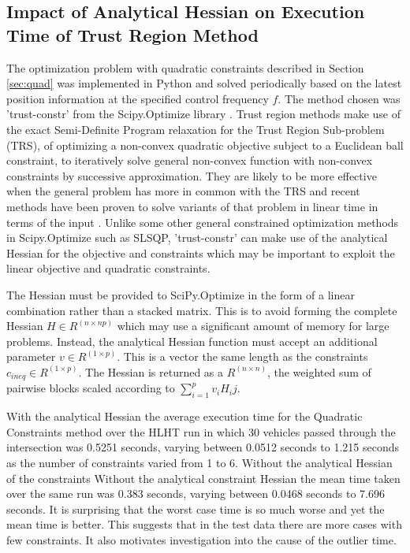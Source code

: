 \subsection{Impact of Analytical Hessian on Execution Time of Trust Region Method}
The optimization problem with quadratic constraints described in Section \ref{sec:quad} was implemented in Python and solved periodically based on the latest position information at the specified control frequency $f$. The method chosen was 'trust-constr' from the Scipy.Optimize library \cite{scipy}. Trust region methods make use of the exact Semi-Definite Program relaxation for the Trust Region Sub-problem (TRS), of optimizing a non-convex quadratic objective subject to a Euclidean ball constraint, to iteratively solve general non-convex function with non-convex constraints by successive approximation\cite{conn2000trust}. They are likely to be more effective when the general problem has more in common with the TRS and recent methods have been proven to solve variants of that problem in linear time in terms of the input \cite{Wang2019}. Unlike some other general constrained optimization methods in Scipy.Optimize such as SLSQP, 'trust-constr' can make use of the analytical Hessian for the objective and constraints which may be important to exploit the linear objective and quadratic constraints.   

The Hessian must be provided to SciPy.Optimize in the form of a linear combination rather than a stacked matrix. This is to avoid forming the complete Hessian $H \in R^{(n \times np)}$ which may use a significant amount of memory for large problems. Instead, the analytical Hessian function must accept an additional parameter $v \in R^{(1 \times p)}$. This is a vector the same length as the constraints $c_{ineq} \in R^{(1 \times p)}$. The Hessian is returned as a $R^{(n \times n)}$, the weighted sum of pairwise blocks scaled according to $\sum_{i=1}^p v_i H_ij$.

With the analytical Hessian the average execution time for the Quadratic Constraints method over the HLHT run in which 30 vehicles passed through the intersection was 0.5251 seconds, varying between 0.0512 seconds to 1.215 seconds as the number of constraints varied from 1 to 6. Without the analytical Hessian of the constraints
Without the analytical constraint  Hessian the mean time taken over the same run was 0.383 seconds, varying between 0.0468 seconds to 7.696 seconds. It is surprising that the worst case time is so much worse and yet the mean time is better. This suggests that in the test data there are more cases with few constraints. It also motivates investigation into the cause of the outlier time. 

